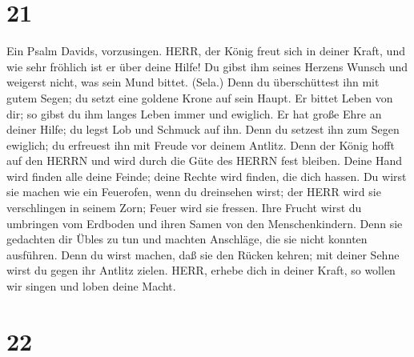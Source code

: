 \hypertarget{section-20}{%
\section{21}\label{section-20}}

 Ein Psalm Davids, vorzusingen. HERR, der König freut sich
in deiner Kraft, und wie sehr fröhlich ist er über deine Hilfe!
 Du gibst ihm seines Herzens Wunsch und weigerst nicht, was
sein Mund bittet. (Sela.)  Denn du überschüttest ihn mit
gutem Segen; du setzt eine goldene Krone auf sein Haupt.  Er
bittet Leben von dir; so gibst du ihm langes Leben immer und ewiglich.
 Er hat große Ehre an deiner Hilfe; du legst Lob und Schmuck
auf ihn.  Denn du setzest ihn zum Segen ewiglich; du
erfreuest ihn mit Freude vor deinem Antlitz.  Denn der König
hofft auf den HERRN und wird durch die Güte des HERRN fest bleiben.
 Deine Hand wird finden alle deine Feinde; deine Rechte wird
finden, die dich hassen.  Du wirst sie machen wie ein
Feuerofen, wenn du dreinsehen wirst; der HERR wird sie verschlingen in
seinem Zorn; Feuer wird sie fressen.  Ihre Frucht wirst du
umbringen vom Erdboden und ihren Samen von den Menschenkindern.
 Denn sie gedachten dir Übles zu tun und machten Anschläge,
die sie nicht konnten ausführen.  Denn du wirst machen, daß
sie den Rücken kehren; mit deiner Sehne wirst du gegen ihr Antlitz
zielen.  HERR, erhebe dich in deiner Kraft, so wollen wir
singen und loben deine Macht.

\hypertarget{section-21}{%
\section{22}\label{section-21}}

